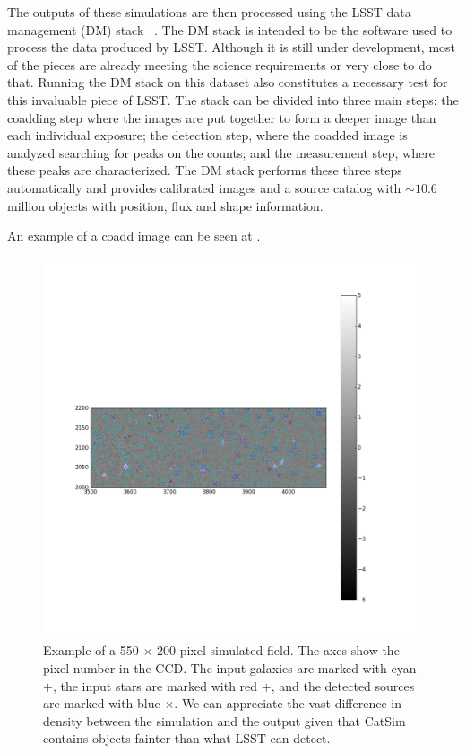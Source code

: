 \documentclass[\docopts]{\docclass}
\begin{document}
The outputs of these simulations are then processed using the LSST data management (DM) stack~\citep{Overview,ScienceBook,WhitePaper,2017arXiv170506766B}  . The DM stack is intended to be the software used to process the data produced by LSST. Although it is still under development, most of the pieces are already meeting the science requirements or very close to do that. Running the DM stack on this dataset also constitutes a necessary test for this invaluable piece of LSST. The stack can be divided into three main steps: the coadding step where the images are put together to form a deeper image than each individual exposure; the detection step, where the coadded image is analyzed searching for peaks on the counts; and the measurement step, where these peaks are characterized. The DM stack performs these three steps automatically and provides calibrated images and a source catalog with $\sim 10.6$ million objects with position, flux and shape information.

An example of a coadd image can be seen at .

\begin{figure}
\centering
\includegraphics[trim={3cm, 14cm, 12cm, 12cm},clip,width=0.9\columnwidth]{field.png}
\caption{Example of a 550 $\times$ 200 pixel simulated field. The axes show the pixel number in the CCD. The input galaxies are marked with cyan $+$, the input stars are marked with red $+$, and the detected sources are marked with blue $\times$. We can appreciate the vast difference in density between the simulation and the output given that CatSim contains objects fainter than what LSST can detect.}
\label{fig:coadd_example}
\end{figure}
\end{document}
